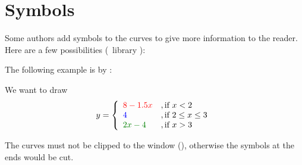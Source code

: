 \section{Symbols}
Some authors add symbols to the curves to give more information to the reader. Here are a few possibilities (\TIKZ\ library ):


\newcommand{\cred}[1]{{\color{red}#1}}
\newcommand{\cgreen}[1]{{\color{green!50!black}#1}}
\newcommand{\cblue}[1]{{\color{blue}#1}}

The following example is by :

We want to draw
\[
y=\left\{\begin{array}{ll}
    \cred{8-1.5x}&,\text{if }x<2\\
    \cblue{4}&,\text{if }2 \leq x \leq 3\\
    \cgreen{2x-4}&,\text{if } x>3
  \end{array}
\right.
\]

The curves must not be clipped to the window (), otherwise the symbols at the ends would be cut.

\begin{center}
\begin{tkzexample}[vbox]
\end{tkzexample}
\end{center}

\endinput
